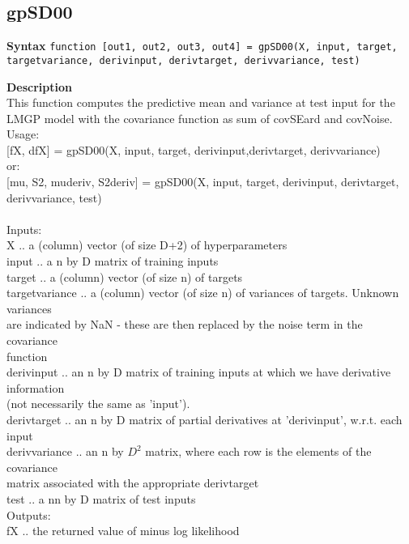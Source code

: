 \subsection*{gpSD00} \label{fun:gpSD00}


\textbf{Syntax} \texttt{function [out1, out2, out3, out4] =
gpSD00(X, input, target,
\\ \tab targetvariance, derivinput,
derivtarget, derivvariance, test)}

\textbf{Description}
\\ This function computes the predictive mean and variance at test input for
 the LMGP model with the covariance function as sum of covSEard
and  covNoise.
\\ Usage:
\\ {[}fX, dfX{]} = gpSD00(X, input, target, derivinput,derivtarget,
derivvariance)
\\ \tab or:
\\{[}mu, S2, muderiv, S2deriv{]} = gpSD00(X, input, target, derivinput, derivtarget,
  \\ \tab     derivvariance, test)
  \\
\\Inputs:
\\ X       ..  a (column) vector (of size D+2) of hyperparameters
\\ input   ..  a n by D matrix of training inputs
\\ target  ..  a (column) vector (of size n) of targets
\\ targetvariance  ..  a (column) vector (of size n) of variances of
 targets. Unknown variances
 \\ \tab are indicated by NaN - these are then
  replaced by the noise term in the covariance
  \\ \tab function
\\ derivinput  ..  an n by D matrix of training inputs at which we have
   derivative information \\ \tab (not necessarily the same as 'input').
\\ derivtarget  ..  an n by D matrix of partial derivatives at 'derivinput',
   w.r.t. each input
\\ derivvariance  ..  an n by $D^2$ matrix, where each row is the elements of
   the covariance \\ \tab matrix associated with the appropriate derivtarget
\\ test    ..  a nn by D matrix of test inputs
\\ Outputs:
\\ fX      ..  the returned value of minus log likelihood
